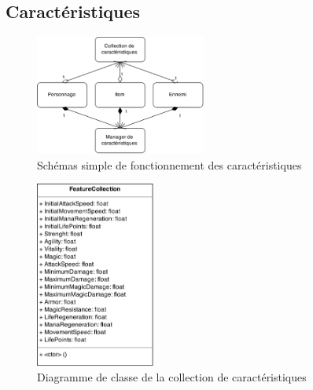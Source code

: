 \documentclass[11pt, a4paper, oneside]{report}
\begin{document}
\subsection{Caractéristiques}
\begin{figure}[H]
	\begin{center}
	\includegraphics[width=0.5\textwidth]{FeatureGlobalWork}
	\caption{Schémas simple de fonctionnement des caractéristiques}
	\label{fig:FeatureGlobalWork}
	\end{center}
\end{figure}
\begin{figure}[H]
	\begin{center}
	\includegraphics[width=0.35\textwidth]{FeatureCollection}
	\caption{Diagramme de classe de la collection de caractéristiques}
	\label{fig:FeatureCollection}
	\end{center}
\end{figure}
\end{document}
